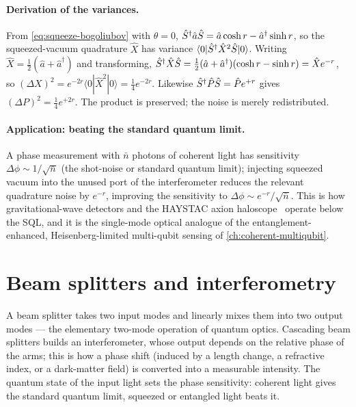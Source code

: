 \paragraph{Derivation of the variances.}
From \cref{eq:squeeze-bogoliubov} with $\theta=0$,
$\hat{S}^\dagger\hat a\hat{S}=\hat a\cosh r-\hat a^\dagger\sinh r$, so
the squeezed-vacuum quadrature $\hat X$ has variance
$\langle0|\hat{S}^\dagger\hat X^2\hat{S}|0\rangle$. Writing
$\hat X=\tfrac12(\hat a+\hat a^\dagger)$ and transforming,
$\hat{S}^\dagger\hat X\hat{S}=\tfrac12(\hat a+\hat a^\dagger)(\cosh r-\sinh r)=\hat X e^{-r}$,
so $(\Delta X)^2=e^{-2r}\langle0|\hat X^2|0\rangle=\tfrac14 e^{-2r}$.
Likewise $\hat{S}^\dagger\hat P\hat{S}=\hat P e^{+r}$ gives
$(\Delta P)^2=\tfrac14 e^{+2r}$. The product is preserved; the noise
is merely redistributed.

\paragraph{Application: beating the standard quantum limit.}
A phase measurement with $\bar n$ photons of coherent light has
sensitivity $\Delta\phi\sim1/\sqrt{\bar n}$ (the shot-noise or
standard quantum limit); injecting squeezed vacuum into the unused
port of the interferometer reduces the relevant quadrature noise by
$e^{-r}$, improving the sensitivity to
$\Delta\phi\sim e^{-r}/\sqrt{\bar n}$. This is how
gravitational-wave detectors and the HAYSTAC axion
haloscope~\cite{haystac2021,malnou2019} operate below the SQL, and
it is the single-mode optical analogue of the entanglement-enhanced,
Heisenberg-limited multi-qubit sensing of
\cref{ch:coherent-multiqubit}.

\section{Beam splitters and interferometry}
\label{sec:beam-splitters}

\begin{phenomenon}
A beam splitter takes two input modes and linearly mixes them into
two output modes --- the elementary two-mode operation of quantum
optics. Cascading beam splitters builds an interferometer, whose
output depends on the relative phase of the arms; this is how a
phase shift (induced by a length change, a refractive index, or a
dark-matter field) is converted into a measurable intensity. The
quantum state of the input light sets the phase sensitivity:
coherent light gives the standard quantum limit, squeezed or
entangled light beats it.
\end{phenomenon}

